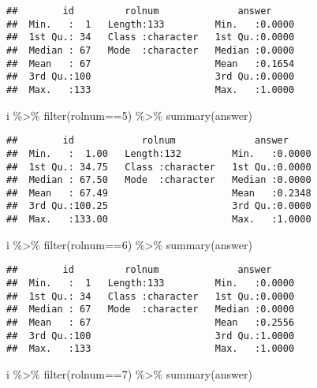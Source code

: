 \documentclass[
]{article}
\newenvironment{Shaded}{\begin{snugshade}}{\end{snugshade}}
\newcommand{\DecValTok}[1]{\textcolor[rgb]{0.00,0.00,0.81}{#1}}
\newcommand{\FunctionTok}[1]{\textcolor[rgb]{0.00,0.00,0.00}{#1}}
\newcommand{\NormalTok}[1]{#1}
\newcommand{\SpecialCharTok}[1]{\textcolor[rgb]{0.00,0.00,0.00}{#1}}
\begin{document}
\begin{enumerate}
\begin{verbatim}
##        id         rolnum              answer      
##  Min.   :  1   Length:133         Min.   :0.0000  
##  1st Qu.: 34   Class :character   1st Qu.:0.0000  
##  Median : 67   Mode  :character   Median :0.0000  
##  Mean   : 67                      Mean   :0.1654  
##  3rd Qu.:100                      3rd Qu.:0.0000  
##  Max.   :133                      Max.   :1.0000
\end{verbatim}

\begin{Shaded}
\begin{Highlighting}[]
\NormalTok{i }\SpecialCharTok{\%\textgreater{}\%} \FunctionTok{filter}\NormalTok{(rolnum}\SpecialCharTok{==}\DecValTok{5}\NormalTok{) }\SpecialCharTok{\%\textgreater{}\%} \FunctionTok{summary}\NormalTok{(answer)}
\end{Highlighting}
\end{Shaded}

\begin{verbatim}
##        id            rolnum              answer      
##  Min.   :  1.00   Length:132         Min.   :0.0000  
##  1st Qu.: 34.75   Class :character   1st Qu.:0.0000  
##  Median : 67.50   Mode  :character   Median :0.0000  
##  Mean   : 67.49                      Mean   :0.2348  
##  3rd Qu.:100.25                      3rd Qu.:0.0000  
##  Max.   :133.00                      Max.   :1.0000
\end{verbatim}

\begin{Shaded}
\begin{Highlighting}[]
\NormalTok{i }\SpecialCharTok{\%\textgreater{}\%} \FunctionTok{filter}\NormalTok{(rolnum}\SpecialCharTok{==}\DecValTok{6}\NormalTok{) }\SpecialCharTok{\%\textgreater{}\%} \FunctionTok{summary}\NormalTok{(answer)}
\end{Highlighting}
\end{Shaded}

\begin{verbatim}
##        id         rolnum              answer      
##  Min.   :  1   Length:133         Min.   :0.0000  
##  1st Qu.: 34   Class :character   1st Qu.:0.0000  
##  Median : 67   Mode  :character   Median :0.0000  
##  Mean   : 67                      Mean   :0.2556  
##  3rd Qu.:100                      3rd Qu.:1.0000  
##  Max.   :133                      Max.   :1.0000
\end{verbatim}

\begin{Shaded}
\begin{Highlighting}[]
\NormalTok{i }\SpecialCharTok{\%\textgreater{}\%} \FunctionTok{filter}\NormalTok{(rolnum}\SpecialCharTok{==}\DecValTok{7}\NormalTok{) }\SpecialCharTok{\%\textgreater{}\%} \FunctionTok{summary}\NormalTok{(answer)}
\end{Highlighting}
\end{Shaded}


\end{enumerate}
\end{document}
